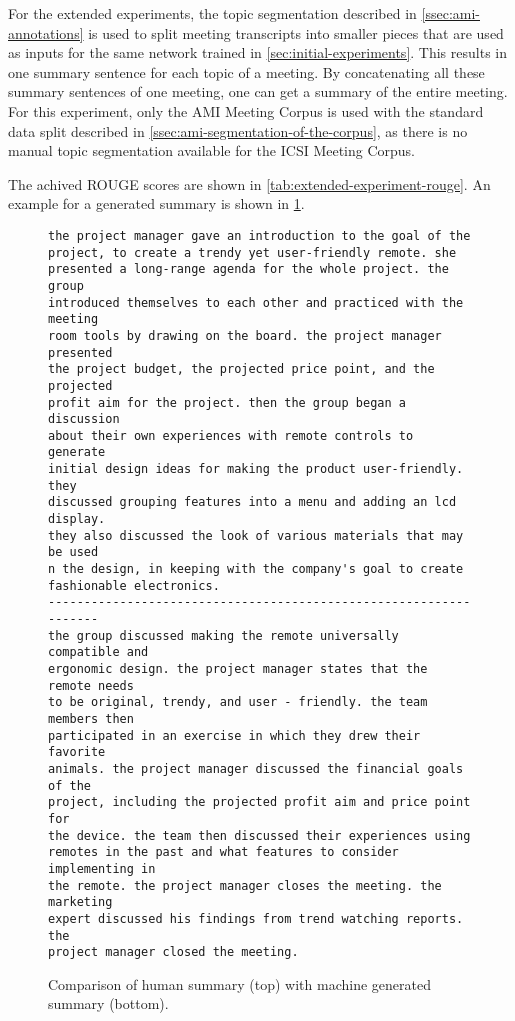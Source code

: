 For the extended experiments, the topic segmentation described in \cref{ssec:ami-annotations} is used to split meeting transcripts into smaller pieces that are used as inputs for the same network trained in \cref{sec:initial-experiments}.
This results in one summary sentence for each topic of a meeting.
By concatenating all these summary sentences of one meeting, one can get a summary of the entire meeting.
For this experiment, only the AMI Meeting Corpus is used with the standard data split described in \cref{ssec:ami-segmentation-of-the-corpus}, as there is no manual topic segmentation available for the ICSI Meeting Corpus.

The achived ROUGE scores are shown in \cref{tab:extended-experiment-rouge}.
An example for a generated summary is shown in \cref{fig:extended-experiment-example}.

\begin{figure}[h]
\begin{lstlisting}[numbers=none]
the project manager gave an introduction to the goal of the
project, to create a trendy yet user-friendly remote. she
presented a long-range agenda for the whole project. the group
introduced themselves to each other and practiced with the meeting
room tools by drawing on the board. the project manager presented
the project budget, the projected price point, and the projected
profit aim for the project. then the group began a discussion
about their own experiences with remote controls to generate
initial design ideas for making the product user-friendly. they
discussed grouping features into a menu and adding an lcd display.
they also discussed the look of various materials that may be used 
n the design, in keeping with the company's goal to create
fashionable electronics. 
------------------------------------------------------------------
the group discussed making the remote universally compatible and
ergonomic design. the project manager states that the remote needs
to be original, trendy, and user - friendly. the team members then
participated in an exercise in which they drew their favorite
animals. the project manager discussed the financial goals of the
project, including the projected profit aim and price point for
the device. the team then discussed their experiences using
remotes in the past and what features to consider implementing in
the remote. the project manager closes the meeting. the marketing
expert discussed his findings from trend watching reports. the
project manager closed the meeting. 
\end{lstlisting}
\caption{Comparison of human summary (top) with machine generated summary (bottom).}
\label{fig:extended-experiment-example}
\end{figure}

